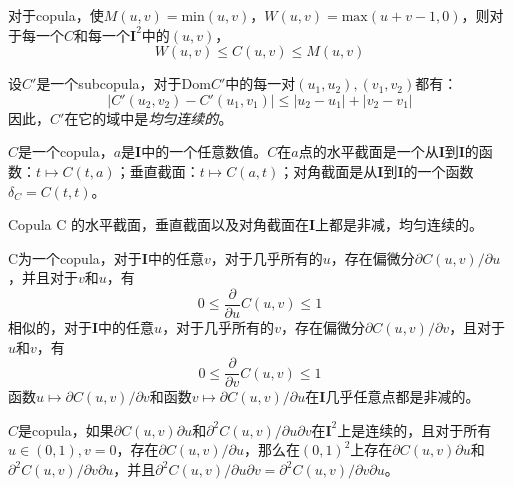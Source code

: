 对于copula，使$M(u,v) = \text{min}(u,v)$，$W(u,v) = \text{max}(u+v-1,0)$，则对于每一个$C$和每一个$\mathbf{I}^2$中的$(u,v)$，
\begin{equation}
    W(u,v) \leq C(u,v) \leq M(u,v)
    \label{eq2.2.5}
\end{equation}
    
\begin{theorem}
    设$C'$是一个subcopula，对于Dom$C'$中的每一对$(u_1,u_2),(v_1,v_2)$都有：
    \begin{equation}
        \left|C'(u_2,v_2)-C'(u_1,v_1)\right| \leq \left|u_2-u_1\right|+\left|v_2-v_1\right|
        \label{eq-thr2.2.4}
    \end{equation}
    因此，$C'$在它的域中是\emph{\textcolor[rgb]{1,0,0}{均匀连续的}}。
    \label{thr2.2.4}
\end{theorem}
\begin{definition}
    $C$是一个copula，$a$是$\mathbf{I}$中的一个任意数值。$C$在$a$点的水平截面是一个从$\mathbf{I}$到$\mathbf{I}$的函数：$t \mapsto C(t,a)$；垂直截面：$t \mapsto C(a,t)$；对角截面是从$\mathbf{I}$到$\mathbf{I}$的一个函数$\delta_C = C(t,t)$。
    \label{def2.2.5}
\end{definition}
\begin{corollary}
    Copula C 的水平截面，垂直截面以及对角截面在$\mathbf{I}$上都是非减，均匀连续的。
    \label{coro2.2.6}
\end{corollary}

\begin{theorem}
    C为一个copula，对于$\mathbf{I}$中的任意$v$，对于几乎所有的$u$，存在偏微分$\partial C(u,v)/\partial u$，并且对于$v$和$u$，有
    \begin{equation}
        0 \leq \dfrac{\partial}{\partial u}C(u,v) \leq 1
        \label{eq2.2.7}
    \end{equation}
    相似的，对于$\mathbf{I}$中的任意$u$，对于几乎所有的$v$，存在偏微分$\partial C(u,v)/\partial v$，且对于$u$和$v$，有
    \begin{equation}
        0 \leq \dfrac{\partial}{\partial v}C(u,v) \leq 1
        \label{eq2.2.8}
    \end{equation}
    函数$u \mapsto \partial C(u,v)/\partial v$和函数$v \mapsto \partial C(u,v)/\partial u$在$\mathbf{I}$几乎任意点都是非减的。
    \label{thr2.2.7}
\end{theorem}

\begin{theorem}
    $C$是copula，如果$\partial C(u,v)\partial u$和$\partial^2 C(u,v)/\partial u\partial v$在$\mathbf{I}^2$上是连续的，且对于所有$u \in (0,1),v=0$，存在$\partial C(u,v)/\partial u$，那么在$(0,1)^2$上存在$\partial C(u,v)\partial u$和$\partial^2C(u,v)/\partial v \partial u$，并且$\partial^2C(u,v)/\partial u \partial v = \partial^2C(u,v)/\partial v \partial u$。
    \label{thr2.2.8}
\end{theorem}

